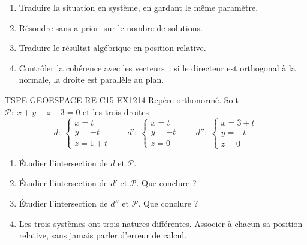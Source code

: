 \begin{enumerate}
  \item Traduire la situation en système, en gardant le même paramètre.
  \item Résoudre sans a priori sur le nombre de solutions.
  \item Traduire le résultat algébrique en position relative.
  \item Contrôler la cohérence avec les vecteurs~: si le directeur est
        orthogonal à la normale, la droite est parallèle au plan.
\end{enumerate}


\begin{exercice}{TSPE-GEOESPACE-RE-C15-EX1}{2}{14}
Repère orthonormé. Soit $\mathcal{P}:\ x+y+z-3=0$ et les trois droites
\[
  d:\ \begin{cases} x=t\\ y=-t\\ z=1+t\end{cases}
  \qquad
  d':\ \begin{cases} x=t\\ y=-t\\ z=0\end{cases}
  \qquad
  d'':\ \begin{cases} x=3+t\\ y=-t\\ z=0\end{cases}
\]
\begin{enumerate}
  \item Étudier l'intersection de $d$ et $\mathcal{P}$.
  \item Étudier l'intersection de $d'$ et $\mathcal{P}$. Que conclure ?
  \item Étudier l'intersection de $d''$ et $\mathcal{P}$. Que conclure ?
  \item Les trois systèmes ont trois natures différentes. Associer à chacun sa
        position relative, sans jamais parler d'erreur de calcul.
\end{enumerate}
\end{exercice}


